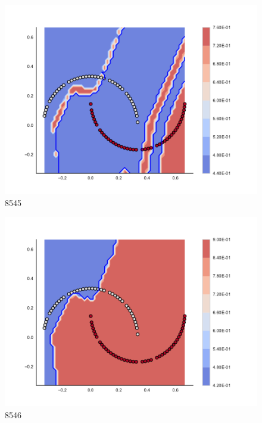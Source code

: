 \begin{subfigure}[b]{0.09\textwidth}
    \includegraphics[clip, trim=2.35cm 1.75cm 4.5cm 0cm,width=\textwidth]{img/convergence/8545.pdf}
    \caption{8545}
    \label{fig:convergence_8545}
\end{subfigure}
%
\begin{subfigure}[b]{0.09\textwidth}
    \includegraphics[clip, trim=2.35cm 1.75cm 4.5cm 0cm,width=\textwidth]{img/convergence/8546.pdf}
    \caption{8546}
    \label{fig:convergence_8546}
\end{subfigure}
%
